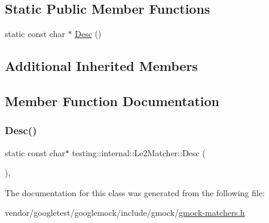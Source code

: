 \subsection*{Static Public Member Functions}
\begin{DoxyCompactItemize}
\item 
static const char $\ast$ \hyperlink{classtesting_1_1internal_1_1_le2_matcher_a92e2aca3f09bb687895b10c272cb392f}{Desc} ()
\end{DoxyCompactItemize}
\subsection*{Additional Inherited Members}


\subsection{Member Function Documentation}
\mbox{\label{classtesting_1_1internal_1_1_le2_matcher_a92e2aca3f09bb687895b10c272cb392f}} 
\subsubsection{\texorpdfstring{Desc()}{Desc()}}
{\footnotesize\ttfamily static const char$\ast$ testing\+::internal\+::\+Le2\+Matcher\+::\+Desc (\begin{DoxyParamCaption}{ }\end{DoxyParamCaption})\hspace{0.3cm}{\ttfamily [inline]}, {\ttfamily [static]}}



The documentation for this class was generated from the following file\+:\begin{DoxyCompactItemize}
\item 
vendor/googletest/googlemock/include/gmock/\hyperlink{gmock-matchers_8h}{gmock-\/matchers.\+h}\end{DoxyCompactItemize}
